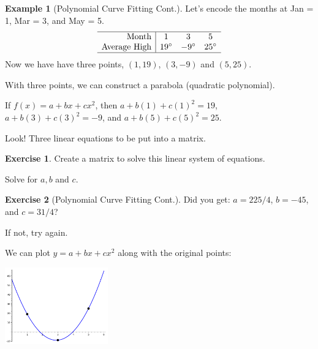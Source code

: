 \documentclass[handout]{beamer}
\theoremstyle{definition}
\newtheorem{exercise}{Exercise}
\newtheorem*{exa}{Example}
\begin{document}
\begin{frame}{\insertframenumber}
\begin{exa}[Polynomial Curve Fitting Cont.]
	Let's encode the months at Jan = 1, Mar = 3, and May = 5.
	\[
	\begin{array}{r|ccc}
	\hline
	\textup{Month} & 1 & 3 & 5\\
	\textup{Average High} & 19^{\circ } & -9^{\circ } & 25^{\circ }\\
	\hline
	\end{array}
	\]
	Now we have have three points, $(1,19)$, $(3,-9)$ and $(5,25)$.
	
	With three points, we can construct a parabola (quadratic polynomial). 
	 
	If $f(x)=a+bx+cx^2$, then $a+b(1)+c(1)^2=19$, $a+b(3)+c(3)^2=-9$, and $a+b(5)+c(5)^2=25$.  
	
	Look! Three linear equations to be put into a matrix.
\end{exa}
\begin{exercise}
	Create a matrix to solve this linear system of equations.\pause
	
	Solve for $a,b$ and $c$.
\end{exercise}
\end{frame}

\begin{frame}{\insertframenumber}
\begin{exercise}[Polynomial Curve Fitting Cont.]

Did you get: $a=225/4$, $b=-45$, and $c=31/4$?

If not, try again.
\pause

We can plot $y=a+bx+cx^2$ along with the original points:

\begin{center}
	\includegraphics[width=1.75in]{images/mars_curve}
\end{center}

\end{exercise}
\end{frame}
\end{document}
